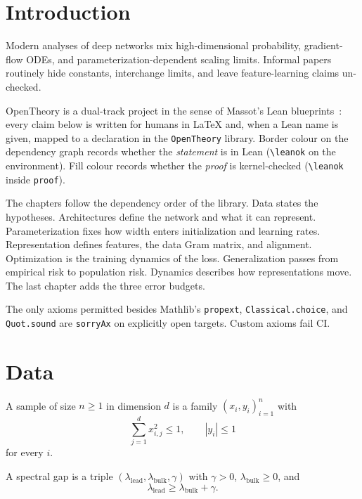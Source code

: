 \chapter{Introduction}

Modern analyses of deep networks mix high-dimensional probability, gradient-flow ODEs, and parameterization-dependent scaling limits. Informal papers routinely hide constants, interchange limits, and leave feature-learning claims un-checked.

OpenTheory is a dual-track project in the sense of Massot's Lean blueprints~\cite{tao2023pfr}: every claim below is written for humans in \LaTeX{} and, when a Lean name is given, mapped to a declaration in the \texttt{OpenTheory} library. Border colour on the dependency graph records whether the \emph{statement} is in Lean (\texttt{\textbackslash leanok} on the environment). Fill colour records whether the \emph{proof} is kernel-checked (\texttt{\textbackslash leanok} inside \texttt{proof}).

The chapters follow the dependency order of the library. Data states the hypotheses. Architectures define the network and what it can represent. Parameterization fixes how width enters initialization and learning rates. Representation defines features, the data Gram matrix, and alignment. Optimization is the training dynamics of the loss. Generalization passes from empirical risk to population risk. Dynamics describes how representations move. The last chapter adds the three error budgets.

The only axioms permitted besides Mathlib's \texttt{propext}, \texttt{Classical.choice}, and \texttt{Quot.sound} are \texttt{sorryAx} on explicitly open targets. Custom axioms fail CI.

\chapter{Data}

\begin{definition}\label{def:sample}
\leanok
A sample of size $n\ge 1$ in dimension $d$ is a family $(x_i,y_i)_{i=1}^n$ with
\[
\sum_{j=1}^d x_{i,j}^2 \le 1, \qquad |y_i|\le 1
\]
for every $i$.
\end{definition}

\begin{definition}\label{def:spectral_gap}
\leanok
A spectral gap is a triple $(\lambda_{\mathrm{lead}},\lambda_{\mathrm{bulk}},\gamma)$ with $\gamma>0$, $\lambda_{\mathrm{bulk}}\ge 0$, and
\[
\lambda_{\mathrm{lead}} \ge \lambda_{\mathrm{bulk}} + \gamma.
\]
\end{definition}

